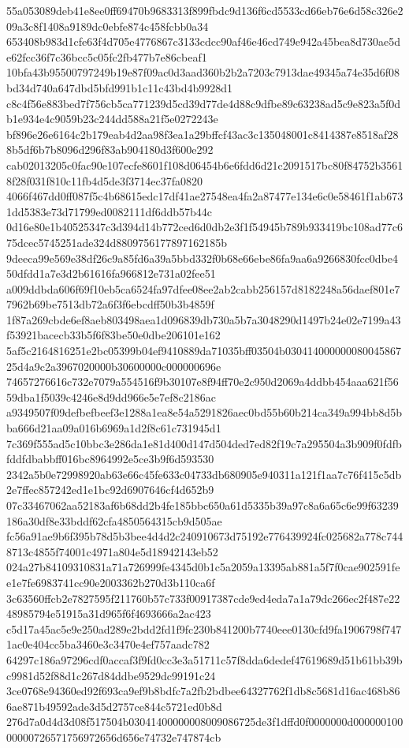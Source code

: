 \documentclass[11pt,a4paper]{article}
\begin{document}
{55a053089deb41e8ee0ff69470b9683313f899fbdc9d136f6cd5533cd66eb76e6d58c326e209a3c8f1408a9189dc0ebfe874c458fcbb0a34
653408b983d1cfe63f4d705e4776867c3133cdcc90af46e46cd749e942a45bea8d730ae5de62fcc36f7c36bcc5c05fc2fb477b7e86cbeaf1
10bfa43b95500797249b19e87f09ac0d3aad360b2b2a7203c7913dae49345a74e35d6f08bd34d740a647dbd5bfd991b1c11c43bd4b9928d1
c8c4f56e883bed7f756cb5ca771239d5cd39d77de4d88c9dfbe89c63238ad5c9e823a5f0db1e934e4c9059b23c244dd588a21f5e0272243e
bf896e26e6164c2b179eab4d2aa98f3ea1a29bffcf43ac3c135048001c8414387e8518af288b5df6b7b8096d296f83ab904180d3f600e292
cab02013205c0fac90e107ecfe8601f108d06454b6e6fdd6d21c2091517bc80f84752b35618f28f031f810c11fb4d5de3f3714ec37fa0820
4066f467dd0ff087f5c4b68615edc17df41ae27548ea4fa2a87477e134e6c0e58461f1ab6731dd5383e73d71799ed0082111df6ddb57b44c
0d16e80e1b40525347c3d394d14b772ced6d0db2e3f1f54945b789b933419bc108ad77c675dcec5745251ade324d8809756177897162185b
9deeca99e569e38df26c9a85fd6a39a5bbd332f0b68e66ebe86fa9aa6a9266830fcc0dbe450dfdd1a7e3d2b61616fa966812e731a02fee51
a009ddbda606f69f10eb5ca6524fa97dfee08ee2ab2cabb256157d8182248a56daef801e77962b69be7513db72a6f3f6ebcdff50b3b4859f
1f87a269cbde6ef8aeb803498aea1d096839db730a5b7a3048290d1497b24e02e7199a43f53921bacecb33b5f6f83be50e0dbe206101e162
5af5c2164816251e2bc05399b04ef9410889da71035bff03504b03041400000008004586725d4a9c2a3967020000b30600000c000000696e
74657276616c732e7079a554516f9b30107e8f94ff70e2c950d2069a4ddbb454aaa621f5659dba1f5039c4246e8d9dd966e5e7ef8c2186ac
a9349507f09defbefbeef3e1288a1ea8e54a5291826aec0bd55b60b214ca349a994bb8d5bba666d21aa09a016b6969a1d2f8c61c731945d1
7c369f555ad5c10bbc3e286da1e81d400d147d504ded7ed82f19c7a295504a3b909f0fdfbfddfdbabbff016bc8964992e5ce3b9f6d593530
2342a5b0e72998920ab63e66c45fe633c04733db680905e940311a121f1aa7c76f415c5db2e7ffec857242ed1e1bc92d6907646cf4d652b9
07c33467062aa52183af6b68dd2b4fe185bbc650a61d5335b39a97c8a6a65c6e99f63239186a30df8e33bddf62cfa4850564315cb9d505ae
fc56a91ae9b6f395b78d5b3bee4d4d2c240910673d75192e776439924fc025682a778c7448713c4855f74001c4971a804e5d18942143eb52
024a27b84109310831a71a726999fe4345d0b1c5a2059a13395ab881a5f7f0cae902591fee1e7fe6983741cc90e2003362b270d3b110ca6f
3c63560ffcb2e7827595f211760b57c733f00917387cde9ed4eda7a1a79dc266ec2f487e2248985794e51915a31d965f6f4693666a2ac423
c5d17a45ac5e9e250ad289e2bdd2fd1f9fc230b841200b7740eee0130cfd9fa1906798f7471ac0e404cc5ba3460e3c3470e4ef757aadc782
64297c186a97296cdf0accaf3f9fd0cc3e3a51711c57f8dda6dedef47619689d51b61bb39bc9981d52f88d1c267d84ddbe9529dc99191c24
3ce0768e94360ed92f693ca9ef9b8bdfc7a2fb2bdbee64327762f1db8c5681d16ac468b866ae871b49592ade3d5d2757ce844c5721ed0b8d
276d7a0d4d3d08f517504b03041400000008009086725de3f1dffd0f0000000d00000010000000726571756972656d656e74732e747874cb
}
\end{document}
